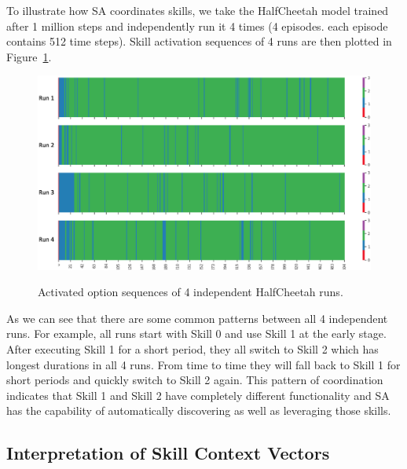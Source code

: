 To illustrate how SA coordinates
skills, we take the HalfCheetah model trained after 1 million
steps and independently run it 4 times (4 episodes. each episode
contains 512 time steps). Skill activation sequences of 4 runs
are then plotted in Figure~\ref{fig:option_pattern}.
\begin{figure}[thb]
  \centering
  \includegraphics[width=0.7\linewidth]{./Part1/figures/option_pattern.png}\\
  \caption{\label{fig:option_pattern} Activated option sequences
    of 4 independent HalfCheetah runs.}
\end{figure}
As we can see that there are some common patterns between all 4
independent runs. For example, all runs start with Skill 0 and
use Skill 1 at the early stage. After executing Skill 1 for a
short period, they all switch to Skill 2 which has longest
durations in all 4 runs. From time to time they will fall back to
Skill 1 for short periods and quickly switch to Skill 2 again.
This pattern of coordination indicates that Skill 1 and Skill 2
have completely different functionality and SA has the capability
of automatically discovering as well as leveraging those
skills.

\subsection{Interpretation of Skill Context Vectors}
\label{sec:append_interpret}

